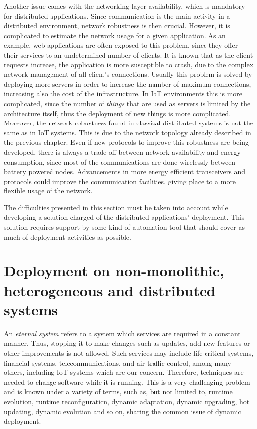 Another issue comes with the networking layer availability, which is mandatory for distributed applications.
Since communication is the main activity in a distributed environment, network robustness is then crucial.
However, it is complicated to estimate the network usage for a given application.
As an example, web applications are often exposed to this problem, since they offer their services to an undetermined number of clients.
It is known that as the client requests increase, the application is more susceptible to crash, due to the complex network management of all client's connections.
Usually this problem is solved by deploying more servers in order to increase the number of maximum connections, increasing also the cost of the infrastructure.
In IoT environments this is more complicated, since the number of \textit{things} that are used as servers is limited by the architecture itself, thus the deployment of new things is more complicated.
Moreover, the network robustness found in classical distributed systems is not the same as in IoT systems.
This is due to the network topology already described in the previous chapter.
Even if new protocols to improve this robustness are being developed\cite{thubert2013ietf}, there is always a trade-off between network availability and energy consumption, since most of the communications are done wirelessly between battery powered nodes.
Advancements in more energy efficient transceivers and protocols could improve the communication facilities, giving place to a more flexible usage of the network.

The difficulties presented in this section must be taken into account while developing a solution charged of the distributed applications' deployment.
This solution requires support by some kind of automation tool that should cover as much of deployment activities as possible. 

\section{Deployment on non-monolithic, heterogeneous and distributed systems}
\label{sec:dynamicDeploymentDAS}
An \textit{eternal system} refers to a system which services are required in a constant manner.
Thus, stopping it to make changes such as updates, add new features or other improvements is not allowed.
Such services may include life-critical systems, financial systems, telecommunications, and air traffic control, among many others, including IoT systems which are our concern.
Therefore, techniques are needed to change software while it is running. 
This is a very challenging problem and is known under a variety of terms, such as, but not limited to, runtime evolution, runtime reconfiguration, dynamic adaptation, dynamic upgrading, hot updating, dynamic evolution and so on, sharing the common issue of dynamic deployment.

